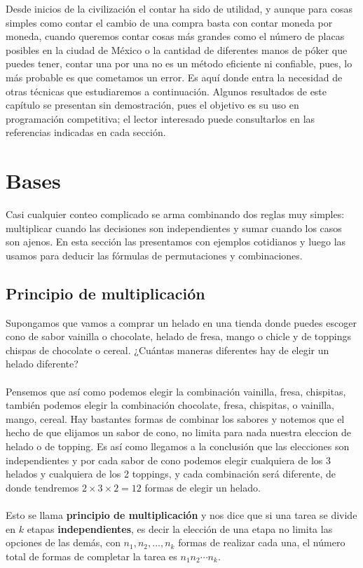 Desde inicios de la civilización el contar ha sido de utilidad, y aunque para cosas simples como contar el cambio de una compra basta con contar moneda por moneda, cuando queremos contar cosas más grandes como el número de placas posibles en la ciudad de México o la cantidad de diferentes manos de póker que puedes tener, contar una por una no es un método eficiente ni confiable, pues, lo más probable es que cometamos un error. Es aquí donde entra la necesidad de otras técnicas que estudiaremos a continuación. Algunos resultados de este capítulo se presentan sin demostración, pues el objetivo es su uso en programación competitiva; el lector interesado puede consultarlos en las referencias indicadas en cada sección.
\section{Bases}

Casi cualquier conteo complicado se arma combinando dos reglas muy simples: multiplicar cuando las decisiones son independientes y sumar cuando los casos son ajenos. En esta sección las presentamos con ejemplos cotidianos y luego las usamos para deducir las fórmulas de permutaciones y combinaciones.

\subsection*{Principio de multiplicación}
Supongamos que vamos a comprar un helado en una tienda donde puedes escoger cono de sabor vainilla o chocolate, helado de fresa, mango o chicle y de toppings chispas de chocolate o cereal. ¿Cuántas maneras diferentes hay de elegir un helado diferente?
\\\\Pensemos que así como podemos elegir la combinación {vainilla, fresa, chispitas}, también podemos elegir la combinación {chocolate, fresa, chispitas}, o {vainilla, mango, cereal}. Hay bastantes formas de combinar los sabores y notemos que el hecho de que elijamos un sabor de cono, no limita para nada nuestra eleccion de helado o de topping. Es así como llegamos a la conclusión que las elecciones son independientes y por cada sabor de cono podemos elegir cualquiera de los 3 helados y cualquiera de los 2 toppings, y cada combinación será diferente, de donde tendremos $2\times 3 \times 2=12$ formas de elegir un helado.
\\\\Esto se llama \textbf{principio de multiplicación} y nos dice que si una tarea se divide en $k$ etapas \textbf{independientes}, es decir la elección de una etapa no limita las opciones de las demás, con $n_1, n_2, \ldots, n_k$ formas de realizar cada una, el número total de formas de completar la tarea es $n_1 n_2 \cdots n_k$.
 

